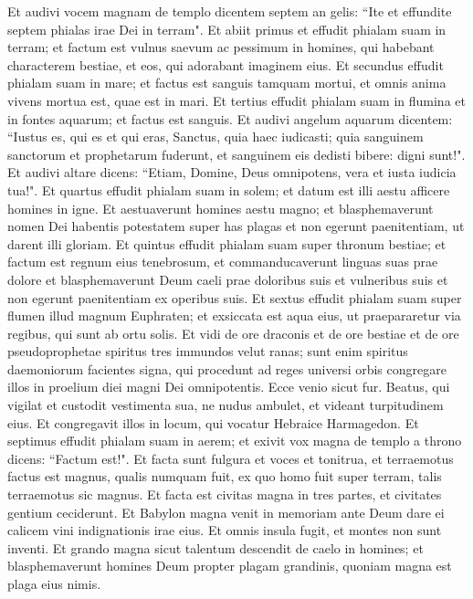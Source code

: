 \begin{biblechapter}  
\verse Et audivi vocem magnam de templo dicentem septem an gelis: “Ite et effundite septem phialas irae Dei in terram". 
\verse Et abiit primus et effudit phialam suam in terram; et factum est vulnus saevum ac pessimum in homines, qui habebant characterem bestiae, et eos, qui adorabant imaginem eius. 
\verse Et secundus effudit phialam suam in mare; et factus est sanguis tamquam mortui, et omnis anima vivens mortua est, quae est in mari. 
\verse Et tertius effudit phialam suam in flumina et in fontes aquarum; et factus est sanguis. 
\verse Et audivi angelum aquarum dicentem: “Iustus es, qui es et qui eras, Sanctus, quia haec iudicasti; 
\verse quia sanguinem sanctorum et prophetarum fuderunt, et sanguinem eis dedisti bibere: digni sunt!". 
\verse Et audivi altare dicens: “Etiam, Domine, Deus omnipotens, vera et iusta iudicia tua!". 
\verse Et quartus effudit phialam suam in solem; et datum est illi aestu afficere homines in igne. 
\verse Et aestuaverunt homines aestu magno; et blasphemaverunt nomen Dei habentis potestatem super has plagas et non egerunt paenitentiam, ut darent illi gloriam. 
\verse Et quintus effudit phialam suam super thronum bestiae; et factum est regnum eius tenebrosum, et commanducaverunt linguas suas prae dolore 
\verse et blasphemaverunt Deum caeli prae doloribus suis et vulneribus suis et non egerunt paenitentiam ex operibus suis. 
\verse Et sextus effudit phialam suam super flumen illud magnum Euphraten; et exsiccata est aqua eius, ut praepararetur via regibus, qui sunt ab ortu solis. 
\verse Et vidi de ore draconis et de ore bestiae et de ore pseudoprophetae spiritus tres immundos velut ranas; 
\verse sunt enim spiritus daemoniorum facientes signa, qui procedunt ad reges universi orbis congregare illos in proelium diei magni Dei omnipotentis. 
\verse Ecce venio sicut fur. Beatus, qui vigilat et custodit vestimenta sua, ne nudus ambulet, et videant turpitudinem eius. 
\verse Et congregavit illos in locum, qui vocatur Hebraice Harmagedon. 
\verse Et septimus effudit phialam suam in aerem; et exivit vox magna de templo a throno dicens: “Factum est!". 
\verse Et facta sunt fulgura et voces et tonitrua, et terraemotus factus est magnus, qualis numquam fuit, ex quo homo fuit super terram, talis terraemotus sic magnus. 
\verse Et facta est civitas magna in tres partes, et civitates gentium ceciderunt. Et Babylon magna venit in memoriam ante Deum dare ei calicem vini indignationis irae eius. 
\verse Et omnis insula fugit, et montes non sunt inventi. 
\verse Et grando magna sicut talentum descendit de caelo in homines; et blasphemaverunt homines Deum propter plagam grandinis, quoniam magna est plaga eius nimis. 
\end{biblechapter}

